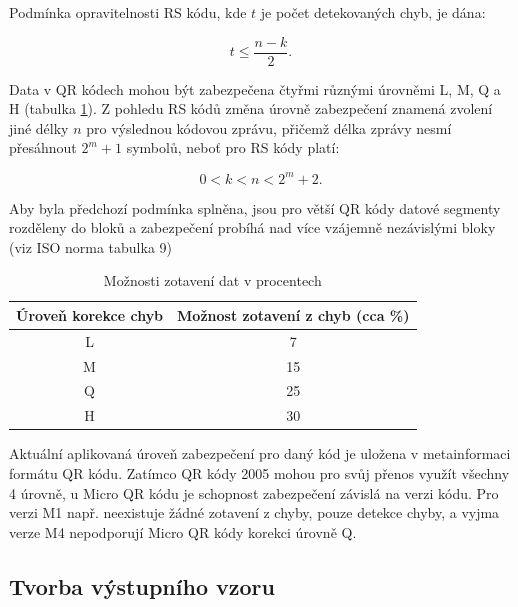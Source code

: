 Podmínka opravitelnosti RS kódu, kde $t$ je počet
detekovaných chyb, je dána: \cite{sklarRSCodes}

\begin{equation}
  t \leq \frac{n - k}{2}\mbox{.}
\end{equation}

Data v QR kódech mohou být zabezpečena čtyřmi různými úrovněmi L, M, Q a H
(tabulka \ref{moznostiZotaveniTabulka}). Z pohledu RS kódů změna úrovně
zabezpečení znamená zvolení jiné délky $n$ pro výslednou kódovou zprávu, přičemž délka zprávy nesmí přesáhnout 
$2^m+1$ symbolů, neboť pro RS kódy platí: \cite{sklarRSCodes}

\begin{equation}
  0 < k < n < 2^{m} + 2\mbox{.}
\end{equation}

Aby byla předchozí podmínka splněna, jsou pro větší QR kódy datové segmenty
rozděleny do bloků a zabezpečení probíhá nad více vzájemně nezávislými bloky
(viz ISO norma tabulka 9)

\begin{table}[H]
  \begin{center} 
    \begin{tabular}{| c | c |} \hline
    \textbf{Úroveň korekce chyb} & \textbf{Možnost zotavení z chyb (cca \%)} \\ \hline
    L & 7 \\ \hline
    M & 15 \\ \hline
    Q & 25 \\ \hline
    H & 30 \\ \hline
    \end{tabular}
    \caption{Možnosti zotavení dat v procentech}
    \label{moznostiZotaveniTabulka}
  \end{center}
\end{table}

Aktuální aplikovaná úroveň zabezpečení pro daný kód je uložena v metainformaci
formátu QR kódu. Zatímco QR kódy 2005 mohou pro svůj přenos využít všechny 4 
úrovně, u Micro QR kódu je schopnost zabezpečení závislá na verzi kódu. Pro 
verzi M1 např. neexistuje žádné zotavení z chyby, pouze detekce chyby, a vyjma 
verze M4 nepodporují Micro QR kódy korekci úrovně Q.

\subsection{Tvorba výstupního vzoru}
\label{tvorbaVystupnihoVzoru}

